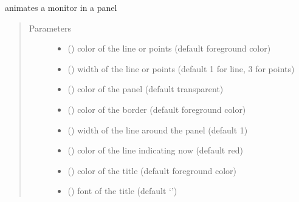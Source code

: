 \documentclass[letterpaper,10pt,english]{sphinxmanual}
\begin{document}
\begin{fulllineitems}
\label{\detokenize{Reference:salabim.AnimateMonitor}}
animates a monitor in a panel
\begin{quote}\begin{description}
\item[{Parameters}] \leavevmode\begin{itemize}
\item {} 
 () \textendash{} color of the line or points (default foreground color)

\item {} 
 () \textendash{} width of the line or points (default 1 for line, 3 for points)

\item {} 
 () \textendash{} color of the panel (default transparent)

\item {} 
 () \textendash{} color of the border (default foreground color)

\item {} 
 () \textendash{} width of the line around the panel (default 1)

\item {} 
 () \textendash{} color of the line indicating now (default red)

\item {} 
 () \textendash{} color of the title (default foreground color)

\item {} 
 ({\hyperref[\detokenize{Reference:salabim.Animate.font}]{}}) \textendash{} font of the title (default ‘’)


\end{itemize}
\end{description}
\end{quote}
\end{fulllineitems}
\end{document}
